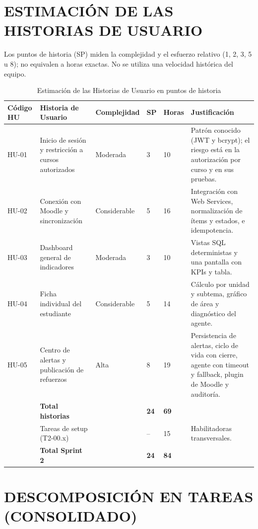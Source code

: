 \documentclass[11pt,a4paper]{article}
\newcommand{\hd}[1]{\textbf{#1}}
\begin{document}
\section{ESTIMACIÓN DE LAS HISTORIAS DE USUARIO}

Los puntos de historia (SP) miden la complejidad y el esfuerzo relativo (1, 2, 3, 5 u 8); no equivalen a horas exactas. No se utiliza una velocidad histórica del equipo.

\begin{table}[H]
\centering\small
\caption{Estimación de las Historias de Usuario en puntos de historia}
\begin{tabularx}{\textwidth}{|R{1.2cm}|R{3.0cm}|R{2.0cm}|R{1.1cm}|R{1.2cm}|Y|}
\hline
\hd{Código HU} & \hd{Historia de Usuario} & \hd{Complejidad} & \hd{SP} & \hd{Horas} & \hd{Justificación}\\ \hline
HU-01 & Inicio de sesión y restricción a cursos autorizados & Moderada & 3 & 10 & Patrón conocido (JWT y bcrypt); el riesgo está en la autorización por curso y en sus pruebas.\\ \hline
HU-02 & Conexión con Moodle y sincronización & Considerable & 5 & 16 & Integración con Web Services, normalización de ítems y estados, e idempotencia.\\ \hline
HU-03 & Dashboard general de indicadores & Moderada & 3 & 10 & Vistas SQL deterministas y una pantalla con KPIs y tabla.\\ \hline
HU-04 & Ficha individual del estudiante & Considerable & 5 & 14 & Cálculo por unidad y subtema, gráfico de área y diagnóstico del agente.\\ \hline
HU-05 & Centro de alertas y publicación de refuerzos & Alta & 8 & 19 & Persistencia de alertas, ciclo de vida con cierre, agente con timeout y fallback, plugin de Moodle y auditoría.\\ \hline
 & \textbf{Total historias} & & \textbf{24} & \textbf{69} & \\ \hline
 & Tareas de setup (T2-00.x) & & -- & 15 & Habilitadoras transversales.\\ \hline
 & \textbf{Total Sprint 2} & & \textbf{24} & \textbf{84} & \\ \hline
\end{tabularx}
\end{table}

\section{DESCOMPOSICIÓN EN TAREAS (CONSOLIDADO)}
\end{document}
